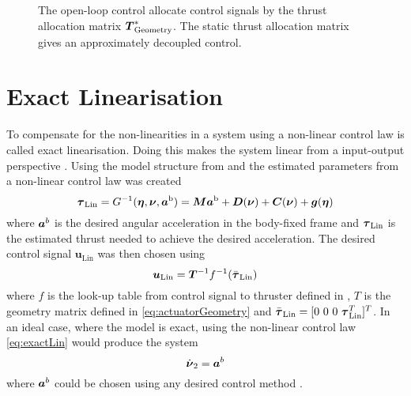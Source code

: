 \begin{figure}
    \centering
    \caption{The open-loop control allocate control signals by the thrust allocation matrix $\thrusterGeometryOnes[*]$. The static thrust allocation matrix gives an approximately decoupled control.}
    \label{fig:open_control}
\end{figure}

\section{Exact Linearisation}
To compensate for the non-linearities in a system using a non-linear control law is called exact linearisation. Doing this makes the system linear from a input-output perspective \citep{reglerteori}. Using the model structure from  and the estimated parameters from  a non-linear control law was created 
\begin{equation}\label{eq:exactLin}
\tauVector_{\text{Lin}} = G^{-1}(\etaVector,\nuVector,\accVector^{\text{b}}) = \inertia \accVector^{\text{b}} + \damping(\nuVector) + \coriolis(\nuVector) + \gravity(\etaVector)
\end{equation}
where $\accVector^b$ is the desired angular acceleration in the body-fixed frame and $\tauVector_{\text{Lin}}$ is the estimated thrust needed to achieve the desired acceleration.
The desired control signal $\boldsymbol{u}_{\text{Lin}}$ was then chosen using 
\begin{equation}\label{eq:linControlSignal}
\boldsymbol{u}_{\text{Lin}} = \boldsymbol{T}^{-1}f^{-1}(\bar{\tauVector}_{\text{Lin}})
\end{equation} where $f$ is the look-up table from control signal to thruster defined in , $T$ is the geometry matrix defined in \eqref{eq:actuatorGeometry} and $\bar{\tauVector}_{\text{Lin}}=[0~0~0~\tauVector_{\text{Lin}}^T]^T$.
In an ideal case, where the model is exact, using the non-linear control law \eqref{eq:exactLin} would produce the system
\begin{equation}\label{eq:exactLinSys}
\nuVectorAngdot = \accVector^b
\end{equation} 
where $\accVector^b$ could be chosen using any desired control method \citep[p.451]{fossen2011}.

